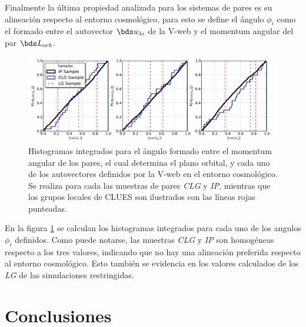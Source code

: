	
Finalmente la última propiedad analizada para los sistemas de pares es su
alineación respecto al entorno cosmológico, para esto se define el ángulo
$\phi_i$ como el formado entre el autovector $\bds u_{\lambda i}$ de la
V-web y el momentum angular del par $\bds L_{orb}$.

	
\begin{figure}[htbp]
	\centering
	\includegraphics[trim = 0mm 0mm 5mm 0mm, clip, width=1.0\textwidth]
	{./figures/4_results/CLG_Alineation.pdf}
	
	\caption{\small{Histogramas integrados para el ángulo formado entre el 
	momentum angular de los pares, el cual determina el plano orbital, y
	cada uno de los autovectores definidos por la V-web en el entorno
	cosmológico. Se realiza para cada las muestras de pares \textit{CLG} y 
	\textit{IP}, mientras que los grupos locales de CLUES son ilustrados 
	con las líneas rojas punteadas.}}
	\label{fig:CLG_Alineation}
\end{figure}
	

En la figura \ref{fig:CLG_Alineation} se calculan los histogramas 
integrados para cada uno de los angulos $\phi_i$ definidos. Como puede 
notarse, las muestras \textit{CLG} y \textit{IP} son homogéneas respecto
a los tres valores, indicando que no hay una alineación preferida respecto
al entorno cosmológico. Esto también se evidencia en los valores calculados
de los \textit{LG} de las simulaciones restringidas.





	
\section{Conclusiones}
\label{sec:Conclusions}


